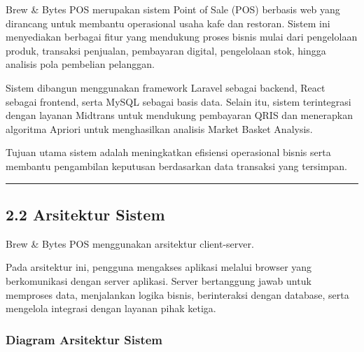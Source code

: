 Brew \& Bytes POS merupakan sistem Point of Sale (POS) berbasis web yang dirancang untuk membantu operasional usaha kafe dan restoran. Sistem ini menyediakan berbagai fitur yang mendukung proses bisnis mulai dari pengelolaan produk, transaksi penjualan, pembayaran digital, pengelolaan stok, hingga analisis pola pembelian pelanggan.

Sistem dibangun menggunakan framework Laravel sebagai backend, React sebagai frontend, serta MySQL sebagai basis data. Selain itu, sistem terintegrasi dengan layanan Midtrans untuk mendukung pembayaran QRIS dan menerapkan algoritma Apriori untuk menghasilkan analisis Market Basket Analysis.

Tujuan utama sistem adalah meningkatkan efisiensi operasional bisnis serta membantu pengambilan keputusan berdasarkan data transaksi yang tersimpan.

\begin{center}\rule{0.5\linewidth}{0.5pt}\end{center}

\subsection{2.2 Arsitektur Sistem}\label{arsitektur-sistem}

Brew \& Bytes POS menggunakan arsitektur client-server.

Pada arsitektur ini, pengguna mengakses aplikasi melalui browser yang berkomunikasi dengan server aplikasi. Server bertanggung jawab untuk memproses data, menjalankan logika bisnis, berinteraksi dengan database, serta mengelola integrasi dengan layanan pihak ketiga.

\subsubsection{Diagram Arsitektur Sistem}\label{diagram-arsitektur-sistem}

\begin{Shaded}
\begin{Highlighting}[]
\NormalTok{+{-}{-}{-}{-}{-}{-}{-}{-}{-}{-}{-}{-}{-}{-}{-}{-}{-}{-}+}
\NormalTok{+{-}{-}{-}{-}{-}{-}{-}{-}{-}{-}{-}{-}{-}{-}{-}{-}{-}{-}+}
\NormalTok{+{-}{-}{-}{-}{-}{-}{-}{-}{-}{-}{-}{-}{-}{-}{-}{-}{-}{-}+}
\NormalTok{+{-}{-}{-}{-}{-}{-}{-}{-}{-}{-}{-}{-}{-}{-}{-}{-}{-}{-}+}
\NormalTok{+{-}{-}{-}{-}{-}{-}{-}{-}{-}{-}{-}{-}{-}{-}{-}{-}{-}{-}+}
\NormalTok{+{-}{-}{-}{-}{-}{-}{-}{-}{-}{-}{-}{-}{-}{-}{-}{-}{-}{-}+}
\end{Highlighting}
\end{Shaded}

